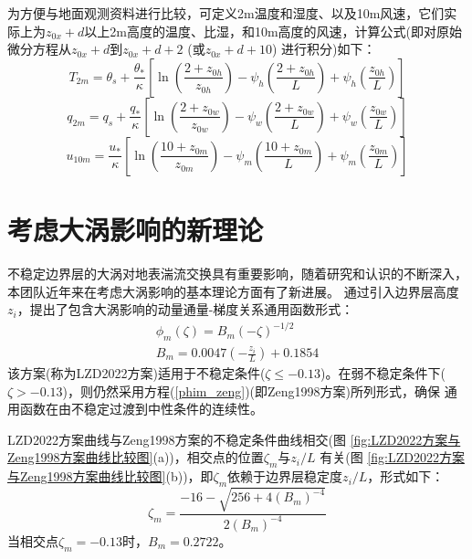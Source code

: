 为方便与地面观测资料进行比较，可定义2m温度和湿度、以及10m风速，它们实际上为$z_{0x}+d$以上2m高度的温度、比湿，和10m高度的风速，计算公式(即对原始微分方程从$z_{0x}+d$到$z_{0x}+d+2$ (或$z_{0x}+d+10$) 进行积分)如下：
\begin{equation}\label{T2m}
T_{2 m}=\theta_{s}+\frac{\theta_{*}}{\kappa}\left[\ln \left(\frac{2+z_{0 h}}{z_{0 h}}\right)-\psi_{h}\left(\frac{2+z_{0 h}}{L}\right)+\psi_{h}\left(\frac{z_{0 h}}{L}\right)\right]
\end{equation}
\begin{equation}\label{q2m}
q_{2 m}=q_{s}+\frac{q_{*}}{\kappa}\left[\ln \left(\frac{2+z_{0 w}}{z_{0 w}}\right)-\psi_{w}\left(\frac{2+z_{0 w}}{L}\right)+\psi_{w}\left(\frac{z_{0 w}}{L}\right)\right]
\end{equation}
\begin{equation}
u_{10 m}=\frac{u_{*}}{\kappa}\left[\ln \left(\frac{10+z_{0 m}}{z_{0 m}}\right)-\psi_{m}\left(\frac{10+z_{0 m}}{L}\right)+\psi_{m}\left(\frac{z_{0 m}}{L}\right)\right]
\end{equation}


\section{考虑大涡影响的新理论}\label{考虑大涡影响的新理论}
不稳定边界层的大涡对地表湍流交换具有重要影响，随着研究和认识的不断深入，本团队近年来在考虑大涡影响的基本理论方面有了新进展。\citet{liu2019further,liu2022surface}
通过引入边界层高度$z_i$，提出了包含大涡影响的动量通量-梯度关系通用函数形式：
\begin{equation}
     \begin{array}{c}\phi_{m}(\zeta)=B_{m} (-\zeta)^{-1/2} \\
          B_{m}=0.0047(-\frac{z_{i}}{L})+0.1854
     \end{array}
\end{equation}
该方案(称为LZD2022方案)适用于不稳定条件($\zeta \leq -0.13$)。在弱不稳定条件下($\zeta > -0.13$)，则仍然采用方程(\ref{phim_zeng})(即Zeng1998方案)所列形式，确保
通用函数在由不稳定过渡到中性条件的连续性。

LZD2022方案曲线与Zeng1998方案的不稳定条件曲线相交(图 \ref{fig:LZD2022方案与Zeng1998方案曲线比较图}(a))，相交点的位置$\zeta_{m}$与${z_{i}}/{L}$
有关(图 \ref{fig:LZD2022方案与Zeng1998方案曲线比较图}(b))，即$\zeta_{m}$依赖于边界层稳定度${z_{i}}/{L}$，形式如下：
\begin{equation}
     \zeta_{m}=\frac{-16-\sqrt{256+4 \left(B_{m}\right)^{-4}}}{2 \left(B_{m}\right)^{-4}}
\end{equation}
当相交点$\zeta_{m}=-0.13$时，$B_{m}=0.2722$。

